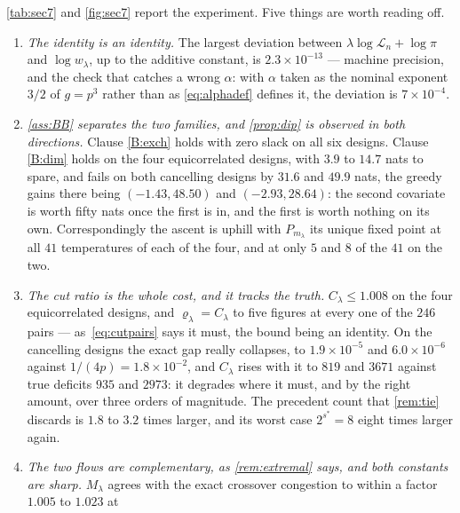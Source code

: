 \documentclass[aos]{imsart}
\theoremstyle{plain}
\theoremstyle{definition}
\begin{document}
    \cref{tab:sec7} and \cref{fig:sec7} report the experiment. Five things
    are worth reading off.

    \begin{enumerate}[label=(\roman*),leftmargin=2.6em]
        \item \emph{The identity is an identity.} The largest deviation
        between $\lambda\log\mathcal{L}_n+\log\pi$ and $\log w_\lambda$, up
        to the additive constant, is $2.3\times10^{-13}$ --- machine
        precision, and the check that catches a wrong $\alpha$: with
        $\alpha$ taken as the nominal exponent $3/2$ of $g=p^{3}$ rather
        than as \eqref{eq:alphadef} defines it, the deviation is
        $7\times10^{-4}$.
        \item \emph{\cref{ass:BB} separates the two families, and
        \cref{prop:dip} is observed in both directions.} Clause
        \ref{B:exch} holds with zero slack on all six designs. Clause
        \ref{B:dim} holds on the four equicorrelated designs, with $3.9$ to
        $14.7$ nats to spare, and fails on both cancelling designs by
        $31.6$ and $49.9$ nats, the greedy gains there being
        $(-1.43,48.50)$ and $(-2.93,28.64)$: the second covariate is worth
        fifty nats once the first is in, and the first is worth nothing on
        its own. Correspondingly the ascent is uphill with $P_{m_\lambda}$
        its unique fixed point at all $41$ temperatures of each of the four,
        and at only $5$ and $8$ of the $41$ on the two.
        \item \emph{The cut ratio is the whole cost, and it tracks the
        truth.} $C_\lambda\leq1.008$ on the four equicorrelated designs, and
        $\varrho_\lambda=C_\lambda$ to five figures at every one of the
        $246$ pairs --- as~\eqref{eq:cutpairs} says it must, the bound being
        an identity. On the cancelling designs the exact gap really
        collapses, to $1.9\times10^{-5}$ and $6.0\times10^{-6}$ against
        $1/(4p)=1.8\times10^{-2}$, and $C_\lambda$ rises with it to $819$
        and $3671$ against true deficits $935$ and $2973$: it degrades where
        it must, and by the right amount, over three orders of magnitude.
        The precedent count that \cref{rem:tie} discards is $1.8$ to $3.2$
        times larger, and its worst case $2^{s^{\ast}}=8$ eight times larger
        again.
        \item \emph{The two flows are complementary, as \cref{rem:extremal}
        says, and both constants are sharp.} $M_\lambda$ agrees with the
        exact crossover congestion to within a factor $1.005$ to $1.023$ at

\end{enumerate}
\end{document}
